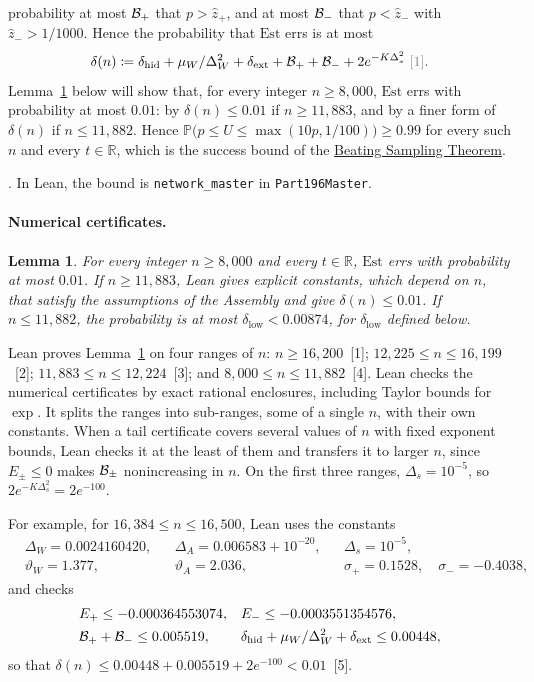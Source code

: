 \documentclass[10pt]{article}
\newcommand{\leanmark}[1]{{\relscale{0.78}\color{gray}[#1]}}
\newenvironment{leanitems}{\par\smallskip\relscale{0.78}\color{gray}\hypersetup{urlcolor=gray}\raggedright%
  \begin{list}{}{\setlength{\leftmargin}{2em}\setlength{\labelwidth}{1.6em}%
  \setlength{\labelsep}{0.4em}\setlength{\itemsep}{0pt}\setlength{\topsep}{0pt}%
  \setlength{\parsep}{0pt}}}{\end{list}\par\medskip}
\newcommand{\bst}{\hyperref[thm:main]{Beating Sampling Theorem}}
\newtheorem{lemma}{Lemma}
\newcommand{\RR}{\mathbb{R}}
\newcommand{\Est}{\mathrm{Est}}
\newcommand{\PP}{\mathbb{P}}
\begin{document}
probability at most $\mathcal{B}_+$ that $p>\hat z_+$, and at most
$\mathcal{B}_-$ that $p<\hat z_-$ with $\hat z_->1/1000$. Hence the probability that $\Est$ errs is at most
\[\delta(n)\coloneqq \delta_{\mathrm{hid}}+\mu_W/\Delta_W^2+\delta_{\mathrm{ext}}
+\Bb_++\Bb_-+2e^{-K\Delta_s^2}~\leanmark{1}.\]
Lemma~\ref{lem:numcert} below will show that, for every integer
$n\ge8{,}000$, $\Est$ errs with probability at most $0.01$: by
$\delta(n)\le0.01$ if $n\ge11{,}883$, and by a finer form of $\delta(n)$ if
$n\le11{,}882$. Hence
$\PP\bigl(p\le U\le\max(10p,1/100)\bigr)\ge0.99$ for every
such $n$ and every $t\in\RR$, which is the success bound of the \bst{}.
\begin{leanitems}
\leanitem*[1]{\leanstepF}. In Lean, the bound is \texttt{network\_master}
in \texttt{Part196Master}.
\end{leanitems}

\paragraph{Numerical certificates.}
\begin{lemma}\label{lem:numcert}
  For every integer $n\ge8{,}000$ and every $t\in\RR$, $\Est$ errs with
  probability at most $0.01$. If $n\ge11{,}883$, Lean gives explicit
  constants, which depend on $n$, that satisfy the assumptions of the
  Assembly and give $\delta(n)\le0.01$. If $n\le11{,}882$, the
  probability is at most $\delta_{\mathrm{low}}<0.00874$, for
  $\delta_{\mathrm{low}}$ defined below.
\end{lemma}
Lean proves Lemma~\ref{lem:numcert} on four ranges of $n$:
$n\ge 16{,}200$~\leanmark{1}; $12{,}225\le n\le16{,}199$~\leanmark{2};
$11{,}883\le n\le 12{,}224$~\leanmark{3}; and $8{,}000\le n\le 11{,}882$~\leanmark{4}.
Lean checks the numerical certificates by exact rational enclosures,
including Taylor bounds for $\exp$. It splits the ranges into sub-ranges,
some of a single $n$, with their own constants. When a tail certificate
covers several values of $n$ with fixed exponent bounds, Lean checks it at
the least of them and transfers it to larger $n$, since
$E_\pm\le0$ makes $\mathcal{B}_\pm$ nonincreasing in $n$. On the first three ranges, $\Delta_s=10^{-5}$, so
$2e^{-K\Delta_s^2}=2e^{-100}$.

For example, for $16{,}384\le n\le16{,}500$, Lean uses the constants
\[\begin{aligned}
&\Delta_W=0.0024160420,&&\Delta_A=0.006583+10^{-20},&&\Delta_s=10^{-5},\\
&\vartheta_W=1.377,&&\vartheta_A=2.036,&&\sigma_+=0.1528,\quad\sigma_-=-0.4038,
\end{aligned}\]
and checks
\[\begin{aligned}
&E_+\le-0.000364553074,&&E_-\le-0.0003551354576,\\
&\mathcal{B}_++\mathcal{B}_-\le0.005519,&&\delta_{\mathrm{hid}}+\mu_W/\Delta_W^2+\delta_{\mathrm{ext}}\le0.00448,
\end{aligned}\]
so that $\delta(n)\le0.00448+0.005519+2e^{-100}<0.01$~\leanmark{5}.
\end{document}
